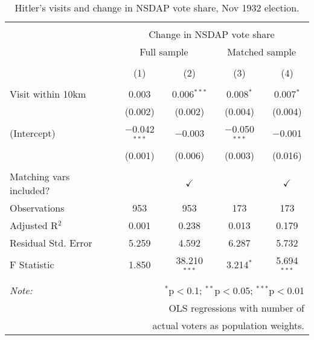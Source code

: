 
\begin{table}[!htbp] \centering 
  \caption{Hitler's visits and change in NSDAP vote share, Nov 1932 election.} 
  \label{tab:ols-d_p_nsdap-3} 
\begin{tabular}{@{\extracolsep{5pt}}lcccc} 
\\[-1.8ex]\hline 
\hline \\[-1.8ex] 
 & \multicolumn{4}{c}{Change in NSDAP vote share} \\ 
\cline{2-5} 
 & \multicolumn{2}{c}{Full sample} & \multicolumn{2}{c}{Matched sample} \\ 
\\[-1.8ex] & (1) & (2) & (3) & (4)\\ 
\hline \\[-1.8ex] 
 Visit within 10km & 0.003 & 0.006$^{***}$ & 0.008$^{*}$ & 0.007$^{*}$ \\ 
  & (0.002) & (0.002) & (0.004) & (0.004) \\ 
  (Intercept) & $-$0.042$^{***}$ & $-$0.003 & $-$0.050$^{***}$ & $-$0.001 \\ 
  & (0.001) & (0.006) & (0.003) & (0.016) \\ 
 \hline \\[-1.8ex] 
Matching vars included? &  & \multicolumn{1}{c}{$\checkmark$} &  & \multicolumn{1}{c}{$\checkmark$} \\ 
Observations & 953 & 953 & 173 & 173 \\ 
Adjusted R$^{2}$ & 0.001 & 0.238 & 0.013 & 0.179 \\ 
Residual Std. Error & 5.259 & 4.592 & 6.287 & 5.732 \\ 
F Statistic & 1.850 & 38.210$^{***}$ & 3.214$^{*}$ & 5.694$^{***}$ \\ 
\hline 
\hline \\[-1.8ex] 
\textit{Note:}  & \multicolumn{4}{r}{$^{*}$p$<$0.1; $^{**}$p$<$0.05; $^{***}$p$<$0.01} \\ 
 & \multicolumn{4}{r}{OLS regressions with number of} \\ 
 & \multicolumn{4}{r}{actual voters as population weights.} \\ 
\end{tabular} 
\end{table} 
